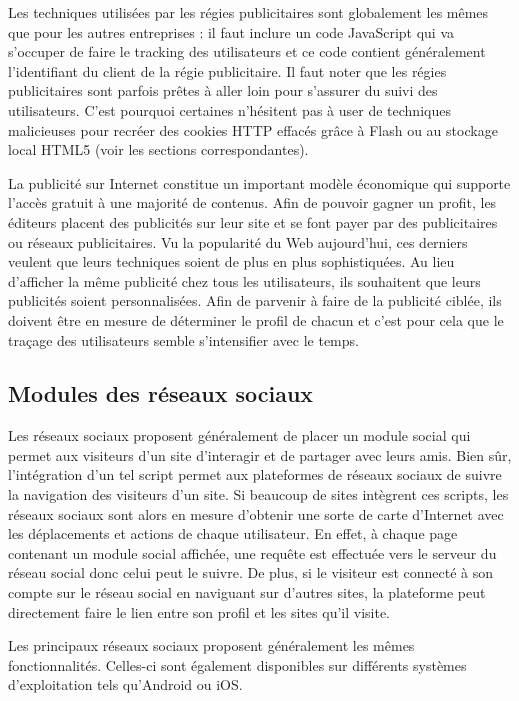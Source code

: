 Les techniques utilisées par les régies publicitaires sont globalement les mêmes que pour les autres entreprises : il faut inclure un code JavaScript qui va s'occuper de faire le tracking des utilisateurs et ce code contient généralement l'identifiant du client de la régie publicitaire. Il faut noter que les régies publicitaires sont parfois prêtes à aller loin pour s'assurer du suivi des utilisateurs. C'est pourquoi certaines n'hésitent pas à user de techniques malicieuses pour recréer des cookies HTTP effacés grâce à Flash ou au stockage local HTML5 (voir les sections correspondantes).
\newline

La publicité sur Internet constitue un important modèle économique qui supporte l'accès gratuit à une majorité de contenus. Afin de pouvoir gagner un profit, les éditeurs placent des publicités sur leur site et se font payer par des publicitaires ou réseaux publicitaires. Vu la popularité du Web aujourd'hui, ces derniers veulent que leurs techniques soient de plus en plus sophistiquées. Au lieu d'afficher la même publicité chez tous les utilisateurs, ils souhaitent que leurs publicités soient personnalisées. Afin de parvenir à faire de la publicité ciblée, ils doivent être en mesure de déterminer le profil de chacun et c'est pour cela que le traçage des utilisateurs semble s'intensifier avec le temps.

\subsection{Modules des réseaux sociaux}
Les réseaux sociaux proposent généralement de placer un module social qui permet aux visiteurs d'un site d'interagir et de partager avec leurs amis. Bien sûr, l'intégration d'un tel script permet aux plateformes de réseaux sociaux de suivre la navigation des visiteurs d'un site. Si beaucoup de sites intègrent ces scripts, les réseaux sociaux sont alors en mesure d'obtenir une sorte de carte d'Internet avec les déplacements et actions de chaque utilisateur. En effet, à chaque page contenant un module social affichée, une requête est effectuée vers le serveur du réseau social donc celui peut le suivre. De plus, si le visiteur est connecté à son compte sur le réseau social en naviguant sur d'autres sites, la plateforme peut directement faire le lien entre son profil et les sites qu'il visite.
\newline

Les principaux réseaux sociaux proposent généralement les mêmes fonctionnalités. Celles-ci sont également disponibles sur différents systèmes d'exploitation tels qu'Android ou iOS.

